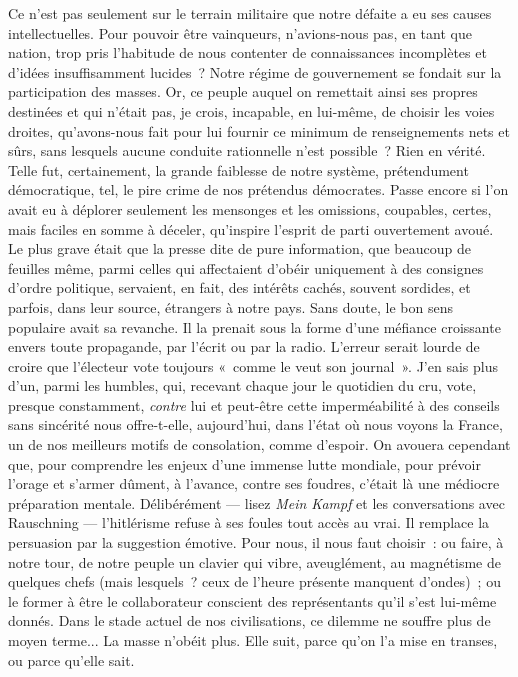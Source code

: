 \documentclass[french,twoside]{book} %
\begin{document}
Ce n’est pas seulement sur le terrain militaire que notre défaite a eu ses causes intellectuelles. Pour pouvoir être vainqueurs, n’avions-nous pas, en tant que nation, trop pris l’habitude de nous contenter de connaissances incomplètes et d’idées insuffisamment lucides ? Notre régime de gouvernement se fondait sur la participation des masses. Or, ce peuple auquel on remettait ainsi ses propres destinées et qui n’était pas, je crois, incapable, en lui-même, de choisir les voies droites, qu’avons-nous fait pour lui fournir ce minimum de renseignements nets et sûrs, sans lesquels aucune conduite rationnelle n’est possible ? Rien en vérité. Telle fut, certainement, la grande faiblesse de notre système, prétendument démocratique, tel, le pire crime de nos prétendus démocrates. Passe encore si l’on avait eu à déplorer seulement les mensonges et les omissions, coupables, certes, mais faciles en somme à déceler, qu’inspire l’esprit de parti ouvertement avoué. Le plus grave était que la presse dite de pure information, que beaucoup de feuilles même, parmi celles qui affectaient d’obéir uniquement à des consignes d’ordre politique, servaient, en fait, des intérêts cachés, souvent sordides, et parfois, dans leur source, étrangers à notre pays. Sans doute, le bon sens populaire avait sa revanche. Il la prenait sous la forme d’une méfiance croissante envers toute propagande, par l’écrit ou par la radio. L’erreur serait lourde de croire que l’électeur vote toujours « comme le veut son journal ». J’en sais plus d’un, parmi les humbles, qui, recevant chaque jour le quotidien du cru, vote, presque constamment, {\itshape contre} lui et peut-être cette imperméabilité à des conseils sans sincérité nous offre-t-elle, aujourd’hui, dans l’état où nous voyons la France, un de nos meilleurs motifs de consolation, comme d’espoir. On avouera cependant   que, pour comprendre les enjeux d’une immense lutte mondiale, pour prévoir l’orage et s’armer dûment, à l’avance, contre ses foudres, c’était là une médiocre préparation mentale. Délibérément — lisez {\itshape Mein Kampf} et les conversations avec Rauschning — l’hitlérisme refuse à ses foules tout accès au vrai. Il remplace la persuasion par la suggestion émotive. Pour nous, il nous faut choisir : ou faire, à notre tour, de notre peuple un clavier qui vibre, aveuglément, au magnétisme de quelques chefs (mais lesquels ? ceux de l’heure présente manquent d’ondes) ; ou le former à être le collaborateur conscient des représentants qu’il s’est lui-même donnés. Dans le stade actuel de nos civilisations, ce dilemme ne souffre plus de moyen terme... La masse n’obéit plus. Elle suit, parce qu’on l’a mise en transes, ou parce qu’elle sait.\par
\end{document}
